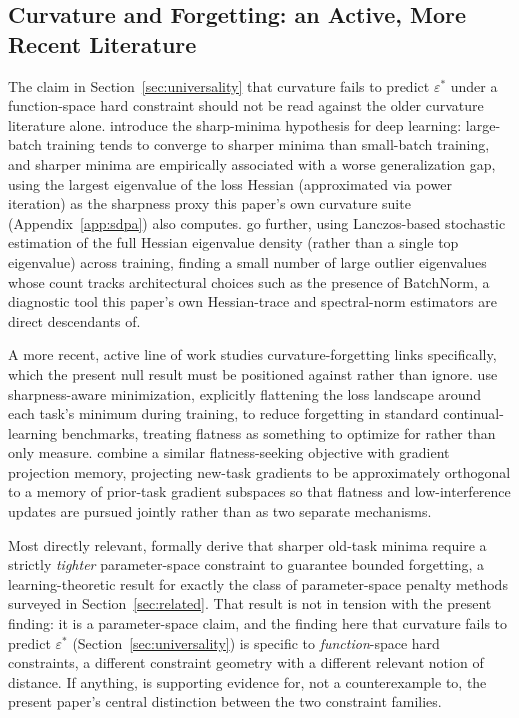 \documentclass[11pt]{article}
\newcommand{\eps}{\varepsilon}
\newcommand{\epsstar}{\eps^{*}}
\begin{document}
\subsection{Curvature and Forgetting: an Active, More Recent Literature}
\label{sec:curvaturerelated}
The claim in Section~\ref{sec:universality} that curvature fails to predict
$\epsstar$ under a function-space hard constraint should not be read
against the older curvature literature alone. \citet{keskar2016large}
introduce the sharp-minima hypothesis for deep learning: large-batch
training tends to converge to sharper minima than small-batch training,
and sharper minima are empirically associated with a worse generalization
gap, using the largest eigenvalue of the loss Hessian (approximated via
power iteration) as the sharpness proxy this paper's own curvature suite
(Appendix~\ref{app:sdpa}) also computes. \citet{ghorbani2019investigation}
go further, using Lanczos-based stochastic estimation of the full Hessian
eigenvalue density (rather than a single top eigenvalue) across training,
finding a small number of large outlier eigenvalues whose count tracks
architectural choices such as the presence of BatchNorm, a diagnostic tool
this paper's own Hessian-trace and spectral-norm estimators are direct
descendants of.

A more recent, active line of work studies curvature-forgetting links
specifically, which the present null result must be positioned against
rather than ignore. \citet{cflat2024} use sharpness-aware minimization,
explicitly flattening the loss landscape around each task's minimum during
training, to reduce forgetting in standard continual-learning benchmarks,
treating flatness as something to optimize for rather than only measure.
\citet{deng2021flattening} combine a similar flatness-seeking objective
with gradient projection memory, projecting new-task gradients to be
approximately orthogonal to a memory of prior-task gradient subspaces so
that flatness and low-interference updates are pursued jointly rather than
as two separate mechanisms.

Most directly relevant, \citet{parameterisolation2023} formally derive
that sharper old-task minima require a strictly \emph{tighter}
parameter-space constraint to guarantee bounded forgetting, a
learning-theoretic result for exactly the class of parameter-space
penalty methods surveyed in Section~\ref{sec:related}. That result is not
in tension with the present finding: it is a parameter-space claim, and
the finding here that curvature fails to predict $\epsstar$
(Section~\ref{sec:universality}) is specific to \emph{function}-space hard
constraints, a different constraint geometry with a different relevant
notion of distance. If anything, \citet{parameterisolation2023} is
supporting evidence for, not a counterexample to, the present paper's
central distinction between the two constraint families.
\end{document}
